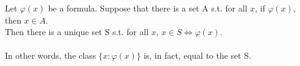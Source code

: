 \begin{theorem}{}{}
    Let $\varphi(x)$ be a formula. Suppose that there is a set A s.t. for all $x$, if $\varphi(x)$, then $x \in A$.\\
    Then there is a unique set S s.t. for all $x$, $x \in S \iff \varphi(x)$. \\
    \\
    In other words, the class $\{x:\varphi(x)\}$ is, in fact, equal to the set S.
\end{theorem}


